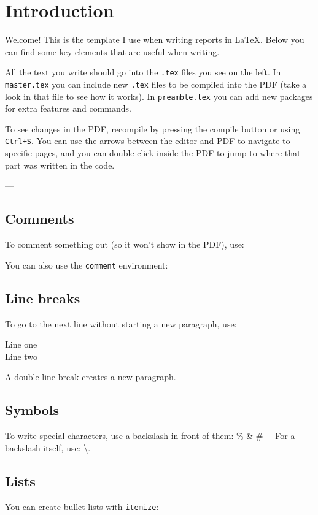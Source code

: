 \chapter{Introduction} \label{ch:introduction}

Welcome! This is the template I use when writing reports in \LaTeX.  
Below you can find some key elements that are useful when writing.  

All the text you write should go into the \texttt{.tex} files you see on the left.  
In \texttt{master.tex} you can include new \texttt{.tex} files to be compiled into the PDF (take a look in that file to see how it works).  
In \texttt{preamble.tex} you can add new packages for extra features and commands.  

To see changes in the PDF, recompile by pressing the compile button or using \texttt{Ctrl+S}.  
You can use the arrows between the editor and PDF to navigate to specific pages, and you can double-click inside the PDF to jump to where that part was written in the code.  

---

\section*{Comments}
To comment something out (so it won’t show in the PDF), use:


You can also use the \texttt{comment} environment:

\section*{Line breaks}
To go to the next line without starting a new paragraph, use:

Line one \\
Line two

A double line break creates a new paragraph.

\section*{Symbols}
To write special characters, use a backslash in front of them:
\% \& \# \_
For a backslash itself, use: \textbackslash.

\newpage
\section*{Lists}
You can create bullet lists with \texttt{itemize}:


